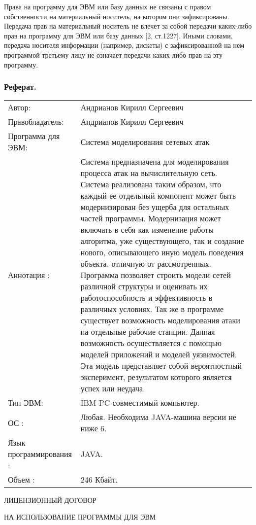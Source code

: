     Права на программу для ЭВМ или базу данных не связаны с правом собственности на материальный носитель, на котором они зафиксированы. Передача прав на материальный носитель не влечет за собой передачи каких-либо прав на программу для ЭВМ или базу данных [2, ст.1227]. Иными словами, передача носителя информации (например, дискеты) с зафиксированной на нем программой третьему лицу не означает передачи каких-либо прав на эту программу.

    

    \subsubsection{Реферат.}

    \begin{tabular}{p{15em}p{25em}}
        Автор: & Андрианов Кирилл Сергеевич \\
        Правобладатель: & Андрианов Кирилл Сергеевич \\
        Программа для ЭВМ: & Система моделирования сетевых атак \\
        Аннотация : & Система предназначена для моделирования процесса атак на вычислительную сеть. Система реализована таким образом, что каждый ее отдельный компонент может быть модернизирован без ущерба для остальных частей программы. Модернизация может включать в себя как изменение работы алгоритма, уже существующего, так и создание нового, описывающего иную модель поведения объекта, отличную от рассмотренных. Программа позволяет строить модели сетей различной структуры и оценивать их работоспособность и эффективность в различных условиях. Так же в программе существует возможность моделирования атаки на отдельные рабочие станции. Данная возможность осуществляется с помощью моделей приложений и моделей уязвимостей. Эта модель представляет собой вероятностный эксперимент, результатом которого является успех или неудача. \\

        Тип ЭВМ: & IBM PC-совместимый компьютер. \\
        ОС : & Любая. Необходима JAVA-машина версии не ниже 6.\\
        Язык программирования : & JAVA. \\
        Объем : & 246 Кбайт.
    \end{tabular}

\newpage

\begin{center}
    ЛИЦЕНЗИОННЫЙ ДОГОВОР

    НА ИСПОЛЬЗОВАНИЕ ПРОГРАММЫ ДЛЯ ЭВМ
\end{center}

